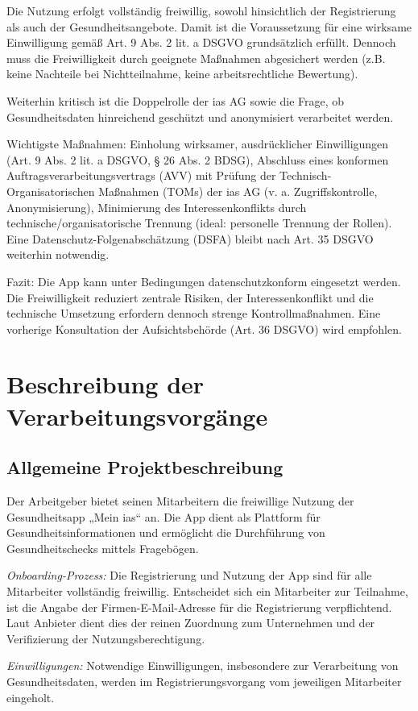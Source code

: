 \documentclass[12pt, a4paper]{article}
\begin{document}
Die Nutzung erfolgt vollständig freiwillig, sowohl hinsichtlich der Registrierung als auch der Gesundheitsangebote. Damit ist die Voraussetzung für eine wirksame Einwilligung gemäß Art. 9 Abs. 2 lit. a DSGVO grundsätzlich erfüllt. Dennoch muss die Freiwilligkeit durch geeignete Maßnahmen abgesichert werden (z.B. keine Nachteile bei Nichtteilnahme, keine arbeitsrechtliche Bewertung).

Weiterhin kritisch ist die Doppelrolle der ias AG sowie die Frage, ob Gesundheitsdaten hinreichend geschützt und anonymisiert verarbeitet werden.

Wichtigste Maßnahmen: Einholung wirksamer, ausdrücklicher Einwilligungen (Art. 9 Abs. 2 lit. a DSGVO, § 26 Abs. 2 BDSG), Abschluss eines konformen Auftragsverarbeitungsvertrags (AVV) mit Prüfung der Technisch-Organisatorischen Maßnahmen (TOMs) der ias AG (v. a. Zugriffskontrolle, Anonymisierung), Minimierung des Interessenkonflikts durch technische/organisatorische Trennung (ideal: personelle Trennung der Rollen). Eine Datenschutz-Folgenabschätzung (DSFA) bleibt nach Art. 35 DSGVO weiterhin notwendig.

Fazit: Die App kann unter Bedingungen datenschutzkonform eingesetzt werden. Die Freiwilligkeit reduziert zentrale Risiken, der Interessenkonflikt und die technische Umsetzung erfordern dennoch strenge Kontrollmaßnahmen. Eine vorherige Konsultation der Aufsichtsbehörde (Art. 36 DSGVO) wird empfohlen.

\section{Beschreibung der Verarbeitungsvorgänge}
\subsection{Allgemeine Projektbeschreibung}
Der Arbeitgeber bietet seinen Mitarbeitern die freiwillige Nutzung der Gesundheitsapp „Mein ias“ an. Die App dient als Plattform für Gesundheitsinformationen und ermöglicht die Durchführung von Gesundheitschecks mittels Fragebögen.

\textit{Onboarding-Prozess:} Die Registrierung und Nutzung der App sind für alle Mitarbeiter vollständig freiwillig. Entscheidet sich ein Mitarbeiter zur Teilnahme, ist die Angabe der Firmen-E-Mail-Adresse für die Registrierung verpflichtend. Laut Anbieter dient dies der reinen Zuordnung zum Unternehmen und der Verifizierung der Nutzungsberechtigung.

\textit{Einwilligungen:} Notwendige Einwilligungen, insbesondere zur Verarbeitung von Gesundheitsdaten, werden im Registrierungsvorgang vom jeweiligen Mitarbeiter eingeholt.
\end{document}

